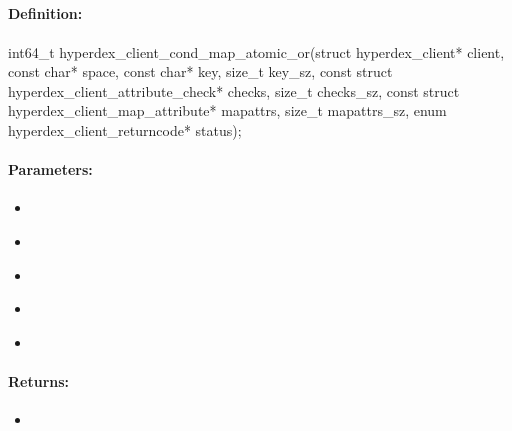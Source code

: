 \pagebreak
\subsection{}
\label{api:c:cond_map_atomic_or}


\paragraph{Definition:}
\begin{ccode}
int64_t hyperdex_client_cond_map_atomic_or(struct hyperdex_client* client,
        const char* space,
        const char* key, size_t key_sz,
        const struct hyperdex_client_attribute_check* checks, size_t checks_sz,
        const struct hyperdex_client_map_attribute* mapattrs, size_t mapattrs_sz,
        enum hyperdex_client_returncode* status);
\end{ccode}

\paragraph{Parameters:}
\begin{itemize}[noitemsep]
\item {}\\

\item {}\\

\item {}\\

\item {}\\

\item {}\\

\end{itemize}

\paragraph{Returns:}
\begin{itemize}[noitemsep]
\item {}\\

\end{itemize}


